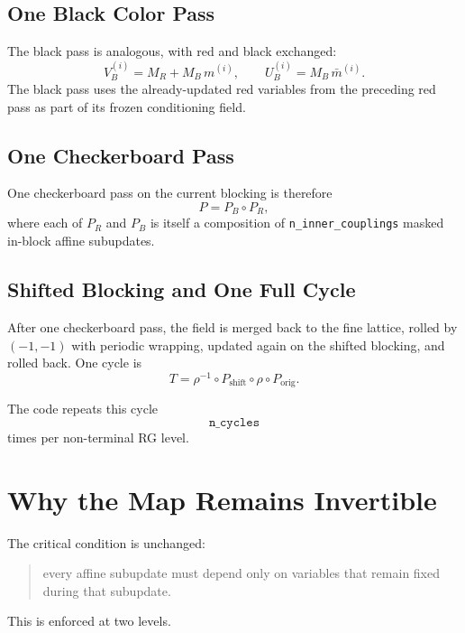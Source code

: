 \documentclass[11pt]{article}
\begin{document}
\subsection{One Black Color Pass}

The black pass is analogous, with red and black exchanged:
\begin{equation}
V_B^{(i)} = M_R + M_B\,m^{(i)},
\qquad
U_B^{(i)} = M_B\,\bar m^{(i)}.
\end{equation}
The black pass uses the already-updated red variables from the preceding red
pass as part of its frozen conditioning field.

\subsection{One Checkerboard Pass}

One checkerboard pass on the current blocking is therefore
\begin{equation}
P = P_B \circ P_R,
\end{equation}
where each of $P_R$ and $P_B$ is itself a composition of
\texttt{n\_inner\_couplings} masked in-block affine subupdates.

\subsection{Shifted Blocking and One Full Cycle}

After one checkerboard pass, the field is merged back to the fine lattice,
rolled by $(-1,-1)$ with periodic wrapping, updated again on the shifted
blocking, and rolled back. One cycle is
\begin{equation}
T = \rho^{-1}\circ P_{\mathrm{shift}}\circ \rho \circ P_{\mathrm{orig}}.
\end{equation}

The code repeats this cycle
\[
\texttt{n\_cycles}
\]
times per non-terminal RG level.

\section{Why the Map Remains Invertible}

The critical condition is unchanged:
\begin{quote}
every affine subupdate must depend only on variables that remain fixed during
that subupdate.
\end{quote}

This is enforced at two levels.
\end{document}
